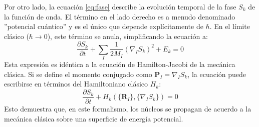 Por otro lado, la ecuación \eqref{eq:fase} describe la evolución temporal de la fase $S_k$ de la función de onda. El término en el lado derecho es a menudo denominado ''potencial cuántico'' y es el único que depende explícitamente de $\hbar$. En el límite clásico ($\hbar \to 0$), este término se anula, simplificando la ecuación a:
\begin{equation}
    \frac{\partial S_k}{\partial t} + \sum_I \frac{1}{2M_I}(\nabla_I S_k)^2 + E_k = 0
    \label{eq:hamilton_jacobi}
\end{equation}
Esta expresión es idéntica a la ecuación de Hamilton-Jacobi de la mecánica clásica. Si se define el momento conjugado como $\mathbf{P}_I = \nabla_I S_k$, la ecuación puede escribirse en términos del Hamiltoniano clásico $H_k$:
\begin{equation}
    \frac{\partial S_k}{\partial t} + H_k(\{\mathbf{R}_I\}, \{\nabla_I S_k\}) = 0
    \label{eq:hamiltoniano} 
\end{equation}
Esto demuestra que, en este formalismo, los núcleos se propagan de acuerdo a la mecánica clásica sobre una superficie de energía potencial.
